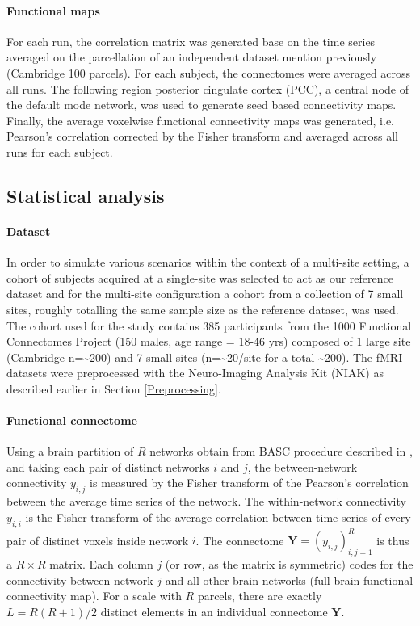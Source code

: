 \documentclass[authoryear]{elsarticle}
\begin{document}
\paragraph{Functional maps}
For each run, the correlation matrix was generated base on the time series averaged on the parcellation of an independent dataset mention previously (Cambridge 100 parcels). For each subject, the connectomes were averaged across all runs. The following region posterior cingulate cortex (PCC), a central node of the default mode network, was used to generate seed based connectivity maps. Finally, the average voxelwise functional connectivity maps was generated, i.e. Pearson's correlation corrected by the Fisher transform and averaged across all runs for each subject.


\subsection{Statistical analysis}  

\paragraph{Dataset}
In order to simulate various scenarios within the context of a multi-site setting, a cohort of subjects acquired at a single-site was selected to act as our reference dataset and for the multi-site configuration a cohort from a collection of 7 small sites, roughly totalling the same sample size as the reference dataset, was used. The cohort used for the study contains 385 participants from the 1000 Functional Connectomes Project \citep{Biswal2010} (150 males, age range = 18-46 yrs) composed of 1 large site (Cambridge n=\textasciitilde200) and 7 small sites (n=\textasciitilde20/site for a total \textasciitilde200). The fMRI datasets were preprocessed with the Neuro-Imaging Analysis Kit (NIAK) as described earlier in Section \ref{Preprocessing}.

\paragraph{Functional connectome}
Using a brain partition of $R$ networks obtain from BASC procedure described in \cite{Bellec2010c}, and taking each pair of distinct networks $i$ and $j$, the between-network connectivity $y_{i,j}$ is measured by the Fisher transform of the Pearson's correlation between the average time series of the network. The within-network connectivity $y_{i,i}$ is the Fisher transform of the average correlation between time series of every pair of distinct voxels inside network $i$. The connectome $\mathbf{Y}=(y_{i,j})_{i,j=1}^R$ is thus a $R\times R$ matrix. Each column $j$ (or row, as the matrix is symmetric) codes for the connectivity between network $j$ and all other brain networks (full brain functional connectivity map). For a scale with $R$ parcels, there are exactly $L=R(R+1)/2$ distinct elements in an individual connectome $\mathbf{Y}$. 
\end{document}
